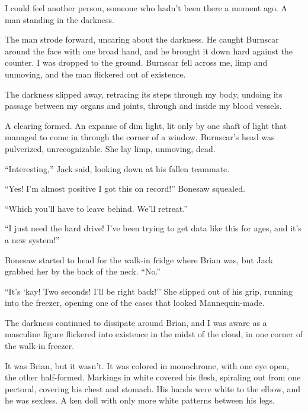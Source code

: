 I could feel another person, someone who hadn't been there a moment ago.  A man standing in the darkness.



The man strode forward, uncaring about the darkness.  He caught Burnscar around the face with one broad hand, and he brought it down hard against the counter.  I was dropped to the ground.  Burnscar fell across me, limp and unmoving, and the man flickered out of existence.



The darkness slipped away, retracing its steps through my body, undoing its passage between my organs and joints, through and inside my blood vessels.



A clearing formed.  An expanse of dim light, lit only by one shaft of light that managed to come in through the corner of a window.  Burnscar's head was pulverized, unrecognizable.  She lay limp, unmoving, dead.



``Interesting,'' Jack said, looking down at his fallen teammate.



``Yes!  I'm almost positive I got this on record!'' Bonesaw squealed.



``Which you'll have to leave behind.  We'll retreat.''



``I just need the hard drive!  I've been trying to get data like this for ages, and it's a new system!''



Bonesaw started to head for the walk-in fridge where Brian was, but Jack grabbed her by the back of the neck.  ``No.''



``It's `kay!  Two seconds!  I'll be right back!''  She slipped out of his grip, running into the freezer, opening one of the cases that looked Mannequin-made.



The darkness continued to dissipate around Brian, and I was aware as a masculine figure flickered into existence in the midst of the cloud, in one corner of the walk-in freezer.



It was Brian, but it wasn't.  It was colored in monochrome, with one eye open, the other half-formed.  Markings in white covered his flesh, spiraling out from one pectoral, covering his chest and stomach.  His hands were white to the elbow, and he was sexless.  A ken doll with only more white patterns between his legs.



